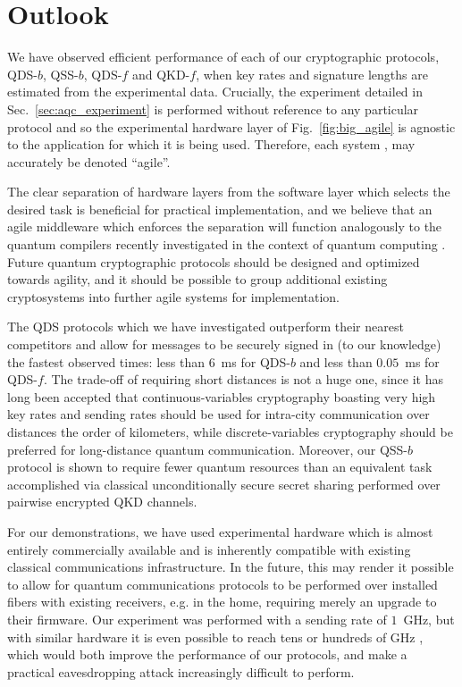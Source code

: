 \FloatBarrier
\section{Outlook}
We have observed efficient performance of each of our cryptographic protocols, QDS-$b$, QSS-$b$, QDS-$f$ and QKD-$f$, when key rates and signature lengths are estimated from the experimental data. Crucially, the experiment detailed in Sec.~\ref{sec:aqc_experiment} is performed without reference to any particular protocol and so the experimental hardware layer of Fig.~\ref{fig:big_agile} is agnostic to the application for which it is being used. Therefore, each system \systemB, \systemF \; may accurately be denoted ``agile''.

The clear separation of hardware layers from the software layer which selects the desired task is beneficial for practical implementation, and we believe that an agile middleware which enforces the separation will function analogously to the quantum compilers recently investigated in the context of quantum computing \cite{Killoran2018, qiskit, Murali2019}. Future quantum cryptographic protocols should be designed and optimized towards agility, and it should be possible to group additional existing cryptosystems into further agile systems for implementation.

The QDS protocols which we have investigated outperform their nearest competitors and allow for messages to be securely signed in (to our knowledge) the fastest observed times: less than $6$~ms for QDS-$b$ and less than $0.05$~ms for QDS-$f$. The trade-off of requiring short distances is not a huge one, since it has long been accepted \cite{Pirandola2015a} that continuous-variables cryptography boasting very high key rates and sending rates should be used for intra-city communication over distances the order of kilometers, while discrete-variables cryptography should be preferred for long-distance quantum communication. Moreover, our QSS-$b$ protocol is shown to require fewer quantum resources than an equivalent task accomplished via classical unconditionally secure secret sharing performed over pairwise encrypted QKD channels.

For our demonstrations, we have used experimental hardware which is almost entirely commercially available and is inherently compatible with existing classical communications infrastructure. In the future, this may render it possible to allow for quantum communications protocols to be performed over installed fibers with existing receivers, e.g. in the home, requiring merely an upgrade to their firmware. Our experiment was performed with a sending rate of $1$~GHz, but with similar hardware it is even possible to reach tens or hundreds of GHz \cite{Khan2015, Khan2016}, which would both improve the performance of our protocols, and make a practical eavesdropping attack increasingly difficult to perform. 


